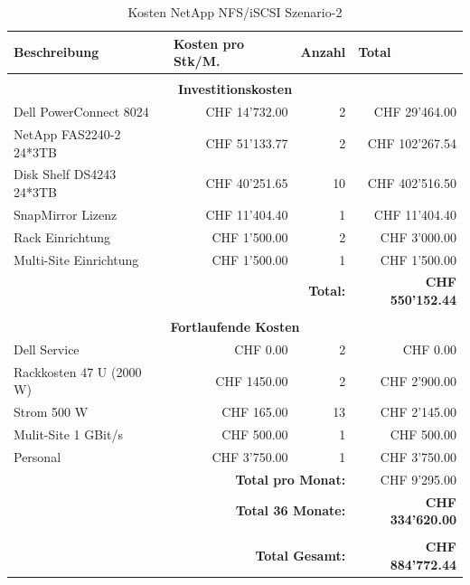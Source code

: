 \begin{table}[htbp]
\caption{Kosten NetApp NFS/iSCSI Szenario-2}
\begin{small}
\begin{tabular}{|l|r|r|r|}
\hline
\textbf{Beschreibung} & \multicolumn{1}{l|}{\textbf{Kosten pro Stk/M.}} & \multicolumn{1}{l|}{\textbf{Anzahl}} & \multicolumn{1}{l|}{\textbf{Total}} \\ \hline
 \multicolumn{ 4}{c}{} \\ \hline
\multicolumn{ 4}{|c|}{\textbf{Investitionskosten}} \\ \hline
Dell PowerConnect 8024 & CHF 14'732.00 & 2 & CHF 29'464.00 \\ \hline
NetApp FAS2240-2 24*3TB & CHF 51'133.77 & 2 & CHF 102'267.54 \\ \hline
Disk Shelf DS4243 24*3TB & CHF 40'251.65 & 10 & CHF 402'516.50 \\ \hline
SnapMirror Lizenz & CHF 11'404.40 & 1 & CHF 11'404.40 \\ \hline
Rack Einrichtung & CHF 1'500.00 & 2 & CHF 3'000.00 \\ \hline 
Multi-Site Einrichtung & CHF 1'500.00 & 1 & CHF 1'500.00 \\ \hline \hline
 \multicolumn{ 3}{r|}{\textbf{Total:}} & \textbf{CHF 550'152.44} \\ 
 \cline{4-4}
\multicolumn{ 4}{c}{} \\ \hline
\multicolumn{ 4}{|c|}{\textbf{Fortlaufende Kosten}} \\ \hline
Dell Service & CHF 0.00 & 2 & CHF 0.00 \\ \hline
Rackkosten 47 U (2000 W) & CHF 1450.00 & 2 & CHF 2'900.00 \\ \hline
Strom 500 W & CHF 165.00 & 13 & CHF 2'145.00 \\ \hline
Mulit-Site 1 GBit/s & CHF 500.00 & 1 & CHF 500.00 \\ \hline
Personal & CHF 3'750.00 & 1 & CHF 3'750.00 \\ \hline \hline
 \multicolumn{ 3}{r|}{\textbf{Total pro Monat:}} & CHF 9'295.00 \\
\cline{4-4}
 \multicolumn{ 3}{r|}{\textbf{Total 36 Monate:}} & \textbf{CHF 334'620.00} \\ \cline{4-4}
 \multicolumn{ 4}{c}{} \\ \cline{4-4}
 \multicolumn{ 3}{r|}{\textbf{Total Gesamt:}} & \textbf{CHF 884'772.44} \\ \cline{4-4}
\end{tabular}
\end{small}
\label{KostenNetAppS2}
\end{table}

